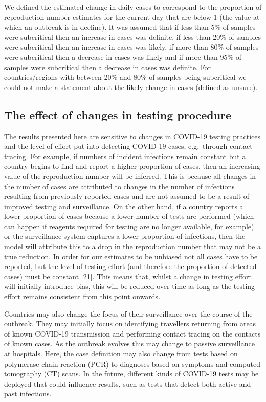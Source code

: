 \documentclass[
]{article}
\begin{document}
We defined the estimated change in daily cases to correspond to the
proportion of reproduction number estimates for the current day that are
below 1 (the value at which an outbreak is in decline). It was assumed
that if less than 5\% of samples were subcritical then an increase in
cases was definite, if less than 20\% of samples were subcritical then
an increase in cases was likely, if more than 80\% of samples were
subcritical then a decrease in cases was likely and if more than 95\% of
samples were subcritical then a decrease in cases was definite. For
countries/regions with between 20\% and 80\% of samples being
subcritical we could not make a statement about the likely change in
cases (defined as unsure).

\hypertarget{the-effect-of-changes-in-testing-procedure}{%
\subsection{The effect of changes in testing
procedure}\label{the-effect-of-changes-in-testing-procedure}}

The results presented here are sensitive to changes in COVID-19 testing
practices and the level of effort put into detecting COVID-19 cases,
e.g.~through contact tracing. For example, if numbers of incident
infections remain constant but a country begins to find and report a
higher proportion of cases, then an increasing value of the reproduction
number will be inferred. This is because all changes in the number of
cases are attributed to changes in the number of infections resulting
from previously reported cases and are not assumed to be a result of
improved testing and surveillance. On the other hand, if a country
reports a lower proportion of cases because a lower number of tests are
performed (which can happen if reagents required for testing are no
longer available, for example) or the surveillance system captures a
lower proportion of infections, then the model will attribute this to a
drop in the reproduction number that may not be a true reduction. In
order for our estimates to be unbiased not all cases have to be
reported, but the level of testing effort (and therefore the proportion
of detected cases) must be constant {[}21{]}. This means that, whilst a
change in testing effort will initially introduce bias, this will be
reduced over time as long as the testing effort remains consistent from
this point onwards.

Countries may also change the focus of their surveillance over the
course of the outbreak. They may initially focus on identifying
travellers returning from areas of known COVID-19 transmission and
performing contact tracing on the contacts of known cases. As the
outbreak evolves this may change to passive surveillance at hospitals.
Here, the case definition may also change from tests based on polymerase
chain reaction (PCR) to diagnoses based on symptoms and computed
tomography (CT) scans. In the future, different kinds of COVID-19 tests
may be deployed that could influence results, such as tests that detect
both active and past infections.
\end{document}
